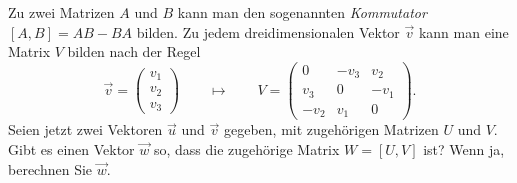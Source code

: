 Zu zwei Matrizen $A$ und $B$ kann man den sogenannten {\em Kommutator}
$[A,B]=AB-BA$ bilden.
Zu jedem dreidimensionalen Vektor $\vec v$ kann man eine Matrix $V$
bilden nach der Regel
\[
\vec v
=
\begin{pmatrix}v_1\\v_2\\v_3\end{pmatrix}
\qquad
\mapsto
\qquad
V
=
\begin{pmatrix}
   0&-v_3& v_2\\
 v_3&   0&-v_1\\
-v_2& v_1&   0
\end{pmatrix}.
\]
Seien jetzt zwei Vektoren $\vec u$ und $\vec v$ gegeben, mit zugehörigen
Matrizen $U$ und $V$.
Gibt es einen Vektor $\vec w$ so, dass die zugehörige Matrix $W=[U,V]$ ist?
Wenn ja, berechnen Sie $\vec w$.

